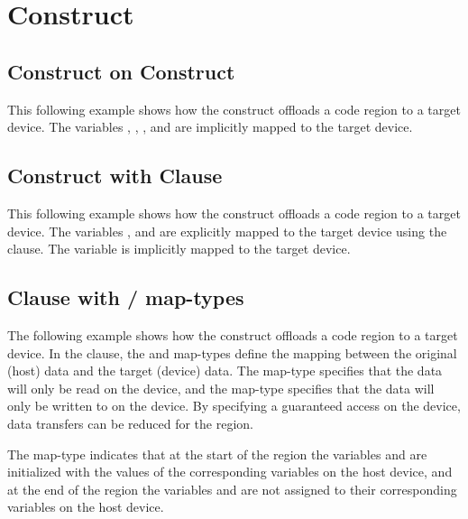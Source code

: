 \pagebreak
\section{ Construct}
\label{sec:target}

\subsection{ Construct on  Construct}
\label{subsec:target_parallel}

This following example shows how the  construct offloads a code 
region to a target device. The variables , , , and  are implicitly mapped 
to the target device.



\subsection{ Construct with  Clause}
\label{subsec:target_map}

This following example shows how the  construct offloads a code 
region to a target device. The variables ,  and  are explicitly mapped to the 
target device using the  clause. The variable  is implicitly mapped to 
the target device.



\subsection{ Clause with / map-types}
\label{subsec:target_map_tofrom}

The following example shows how the  construct offloads a code region 
to a target device. In the  clause, the  and  
map-types define the mapping between the original (host) data and the target (device) 
data. The  map-type specifies that the data will only be read on the 
device, and the  map-type specifies that the data will only be written 
to on the device. By specifying a guaranteed access on the device, data transfers 
can be reduced for the  region.

The  map-type indicates that at the start of the  region 
the variables  and  are initialized with the values of the corresponding variables 
on the host device, and at the end of the  region the variables 
 and  are not assigned to their corresponding variables on the host device.

